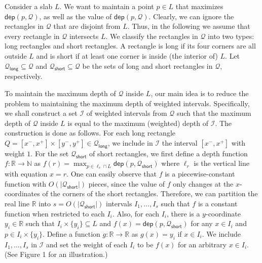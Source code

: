 \documentclass[10pt,a4paper]{article}
\begin{document}
Consider a slab $L$. We want to maintain a point $p\in L$ that maximizes $\mathsf{dep}(p,\mathcal{Q})$, as well as the value of $\mathsf{dep}(p,\mathcal{Q})$. Clearly, we can ignore the rectangles in $\mathcal{Q}$ that are disjoint from $L$. Thus, in the following we assume that every rectangle in $\mathcal{Q}$ intersects $L$. We classify the rectangles in $\mathcal{Q}$ into two types: long rectangles and short rectangles. A rectangle is long if its four corners are all outside $L$ and is short if at least one corner is inside (the interior of) $L$. Let $\mathcal{Q}_{\mathsf{long}}\subseteq\mathcal{Q}$ and $\mathcal{Q}_{\mathsf{short}}\subseteq\mathcal{Q}$ be the sets of long and short rectangles in $\mathcal{Q}$, respectively.
\par
\par
To maintain the maximum depth of $\mathcal{Q}$ inside $L$, our main idea is to reduce the problem to maintaining the maximum depth of weighted intervals. Specifically, we shall construct a set $\mathcal{I}$ of weighted intervals from $\mathcal{Q}$ such that the maximum depth of $\mathcal{Q}$ inside $L$ is equal to the maximum (weighted) depth of $\mathcal{I}$. The construction is done as follows. For each long rectangle $Q=[x^{-},x^{+}]\times[y^{-},y^{+}]\in\mathcal{Q}_{\mathsf{long}}$, we include in $\mathcal{I}$ the interval $[x^{-},x^{+}]$ with weight $1$. For the set $\mathcal{Q}_{\mathsf{short}}$ of short rectangles, we first define a depth function $f:\mathbb{R}\rightarrow\mathbb{N}$ as $f(r)=\max_{p\in\ell_{r}\cap L}\mathsf{dep}(p,\mathcal{Q}_{\mathsf{short}})$ where $\ell_{r}$ is the vertical line with equation $x=r$. One can easily observe that $f$ is a piecewise-constant function with $O(|\mathcal{Q}_{\mathsf{short}}|)$ pieces, since the value of $f$ only changes at the $x$-coordinates of the corners of the short rectangles. Therefore, we can partition the real line $\mathbb{R}$ into $s=O(|\mathcal{Q}_{\mathsf{short}}|)$ intervals $I_{1},\dots,I_{s}$ such that $f$ is a constant function when restricted to each $I_{i}$. Also, for each $I_{i}$, there is a $y$-coordinate $y_{i}\in\mathbb{R}$ such that $I_{i}\times\{y_{i}\}\subseteq L$ and $f(x)=\mathsf{dep}(p,\mathcal{Q}_{\mathsf{short}})$ for any $x\in I_{i}$ and $p\in I_{i}\times\{y_{i}\}$. Define a function $g:\mathbb{R}\rightarrow\mathbb{R}$ as $g(x)=y_{i}$ if $x\in I_{i}$. We include $I_{1},\dots,I_{s}$ in $\mathcal{I}$ and set the weight of each $I_{i}$ to be $f(x)$ for an arbitrary $x\in I_{i}$. (See Figure 1 for an illustration.)
\end{document}

